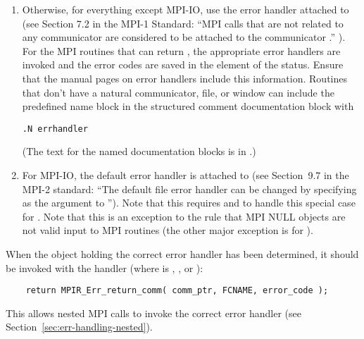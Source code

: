 \documentclass{article}
\begin{document}
\begin{enumerate}
\item Otherwise, for everything except MPI-IO, use the error handler attached
  to   
  (see Section 7.2 in the MPI-1 Standard: ``MPI calls that are not related to
  any communicator are considered to be attached to the communicator
  .'' ).  
  For the MPI routines that can return , the
appropriate error handlers are invoked and the error codes are saved
in the  element of the status.
  Ensure that the manual pages on error handlers
  include this information.  Routines that don't have a natural
communicator, file, or window can include the predefined name block
 in the structured comment documentation block with
\begin{verbatim}
.N errhandler
\end{verbatim}
  (The text for the named documentation blocks is in
  .) 

\item For MPI-IO, the default error handler is attached to
   (see Section~9.7 in the MPI-2 standard: ``The default
  file error handler can be changed by specifying  as the
   argument to '').  Note that this
  requires  and
   to handle this special case for
  .  Note that this is an exception to the
  rule that MPI NULL objects are not valid input to MPI routines (the
  other major exception is for ).
\end{enumerate}

When the object holding the correct error handler has been determined, it
should be invoked with the 
 handler (where  is ,
, or ): %
\begin{verbatim}
    return MPIR_Err_return_comm( comm_ptr, FCNAME, error_code );
\end{verbatim}
This allows nested MPI calls to invoke the correct error handler (see
Section~\ref{sec:err-handling-nested}).  
\end{document}
